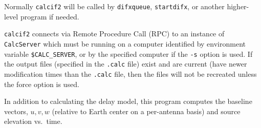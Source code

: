 Normally {\tt calcif2} will be called by {\tt difxqueue}, {\tt startdifx}, or another higher-level program if needed.

{\tt calcif2} connects via Remote Procedure Call (RPC) to an instance of {\tt CalcServer} which must be running on a computer identified by environment variable {\tt \$CALC\_SERVER}, or by the specified computer if the {\tt -s} option is used.
If the output files (specified in the {\tt .calc} file) exist and are current (have newer modification times than the {\tt .calc} file, then the files will not be recreated unless the force option is used.

In addition to calculating the delay model, this program computes the baseline vectors, $u,v,w$ (relative to Earth center on a per-antenna basis) and source elevation vs.\ time.

